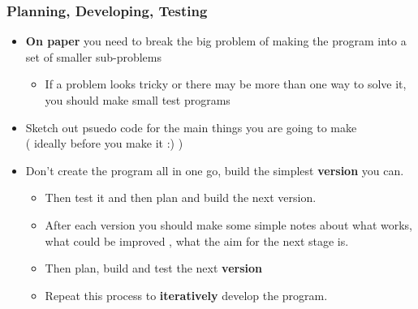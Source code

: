 \documentclass[a4paper,12pt]{article}
\begin{document}
\subsubsection{Planning, Developing, Testing}
\begin{itemize}
	\item \textbf{On paper} you need to break the big problem of making the program into a set of smaller sub-problems
\begin{itemize}
	\item If a problem looks tricky or there may be more than one way to solve it, you should make small test programs
\end{itemize}
\item Sketch out psuedo code for the main things you are going to make\\ ( ideally before you make it :) )
\item Don't create the program all in one go, build the simplest \textbf{version} you can. 
\begin{itemize}
	\item  Then test it and then plan and  build the next version. 
	\item After each version you should make some simple notes about what works, what could be improved , what the aim for the next stage is.
	\item Then plan, build and test the next \textbf{version}
	\item Repeat this process to \textbf{iteratively} develop the program.
\end{itemize}

\end{itemize}
%
\end{document}
